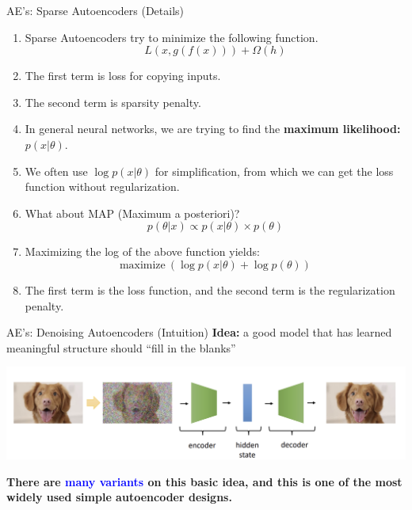\documentclass[serif, aspectratio=169]{beamer}
\begin{document}
\begin{frame}{AE’s: Sparse Autoencoders (Details)}
    \vspace{-0.2cm}

    \begin{enumerate}
        \item Sparse Autoencoders try to minimize the following function.
        \[
            L(x, g(f(x))) + \Omega(h)
        \]
        \item The first term is loss for copying inputs.
        \item The second term is sparsity penalty.
        \item In general neural networks, we are trying to find the \textcolor{green!70!black}{\textbf{maximum likelihood:}} \( p(x|\theta) \).
        \item We often use \( \log p(x|\theta) \) for simplification, from which we can get the loss function without regularization.
        \item What about MAP (Maximum a posteriori)?
        \[p(\theta|x) \propto p(x|\theta) \times p(\theta)\]
        \item Maximizing the log of the above function yields:
        \[
            \text{maximize} \ (\log p(x|\theta) + \log p(\theta))
        \]
        \item The first term is the loss function, and the second term is the 
        regularization penalty.
    \end{enumerate}
    \vspace{0.4cm}
\end{frame}


\begin{frame}{AE’s: Denoising Autoencoders (Intuition)}
    \textbf{Idea:} a good model that has learned meaningful structure should “fill in the blanks”
    \hspace{0.3cm}

    \begin{center}
        \includegraphics[width=\textwidth]{pic/DAE intuition.png} 
    \end{center}

    \vspace{0.5cm}
        \begin{tcolorbox}[colback=blue!5, colframe=blue!70!black, boxrule=0.5pt, width=0.9\textwidth, sharp corners=south]
        \textbf{There are \textcolor{blue}{many variants} on this basic idea, and this is one of the most widely used simple autoencoder designs.}
    \end{tcolorbox}

\end{frame}
\end{document}
